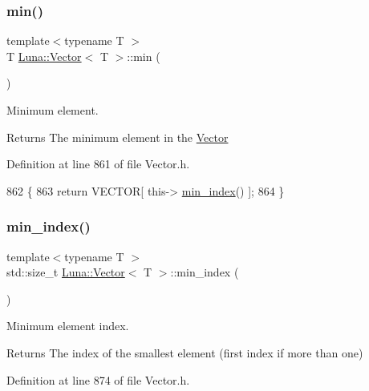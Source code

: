 \subsubsection{\texorpdfstring{min()}{min()}}
{\footnotesize\ttfamily template$<$typename T $>$ \\
T \hyperlink{classLuna_1_1Vector}{Luna\+::\+Vector}$<$ T $>$\+::min (\begin{DoxyParamCaption}{ }\end{DoxyParamCaption})\hspace{0.3cm}{\ttfamily [inline]}}



Minimum element. 

\begin{DoxyReturn}{Returns}
The minimum element in the \hyperlink{classLuna_1_1Vector}{Vector} 
\end{DoxyReturn}


Definition at line 861 of file Vector.\+h.


\begin{DoxyCode}
862   \{
863     \textcolor{keywordflow}{return} VECTOR[ this-> \hyperlink{classLuna_1_1Vector_abb6b63a716faec0dacce220eb82424f8}{min\_index}() ];
864   \}
\end{DoxyCode}
\mbox{\label{classLuna_1_1Vector_abb6b63a716faec0dacce220eb82424f8}} 
\subsubsection{\texorpdfstring{min\+\_\+index()}{min\_index()}}
{\footnotesize\ttfamily template$<$typename T $>$ \\
std\+::size\+\_\+t \hyperlink{classLuna_1_1Vector}{Luna\+::\+Vector}$<$ T $>$\+::min\+\_\+index (\begin{DoxyParamCaption}{ }\end{DoxyParamCaption})\hspace{0.3cm}{\ttfamily [inline]}}



Minimum element index. 

\begin{DoxyReturn}{Returns}
The index of the smallest element (first index if more than one) 
\end{DoxyReturn}


Definition at line 874 of file Vector.\+h.


